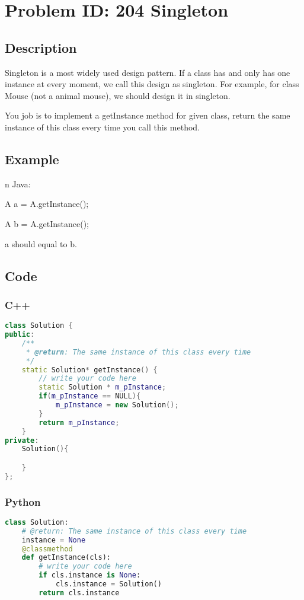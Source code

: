 \section{Problem ID: 204 Singleton}
\subsection{Description}
Singleton is a most widely used design pattern. If a class has and only has one instance at every moment, we call this design as singleton. For example, for class Mouse (not a animal mouse), we should design it in singleton.

You job is to implement a getInstance method for given class, return the same instance of this class every time you call this method.

\subsection{Example}
n Java:

A a = A.getInstance();

A b = A.getInstance();

a should equal to b.

\subsection{Code}
\scriptsize
\subsubsection{C++}
\begin{lstlisting}[language=C++]
class Solution {
public:
    /**
     * @return: The same instance of this class every time
     */
    static Solution* getInstance() {
        // write your code here
        static Solution * m_pInstance;
        if(m_pInstance == NULL){
            m_pInstance = new Solution();
        }
        return m_pInstance;
    }
private:
    Solution(){

    }
};
\end{lstlisting}

\subsubsection{Python}
\begin{lstlisting}[language=Python]
class Solution:
    # @return: The same instance of this class every time
    instance = None
    @classmethod
    def getInstance(cls):
        # write your code here
        if cls.instance is None:
            cls.instance = Solution()
        return cls.instance
\end{lstlisting}
\normalsize 